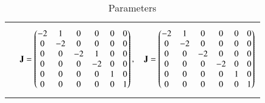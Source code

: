 \begin{table*}[ht!]
{\begin{tabular}{|c|c|}
\\ [0.5ex] 
 & \parbox{10cm}{\begin{align} \mathbf{J}=\begin{pmatrix}-2&1&0&0&0&0\\0&-2&0&0&0&0\\0&0&-2&1&0&0\\0&0&0&-2&0&0\\0&0&0&0&1&0\\0&0&0&0&0&1\end{pmatrix}, \quad \mathbf{J}=\begin{pmatrix}-2&1&0&0&0&0\\0&-2&0&0&0&0\\0&0&-2&0&0&0\\0&0&0&-2&0&0\\0&0&0&0&1&0\\0&0&0&0&0&1\end{pmatrix} \end{align}}
\\ [0.5ex] 
\hline
\end{tabular}
}
\caption{Parameters}
\label{eq:solutions/7/3/4/table:2}
\end{table*}





